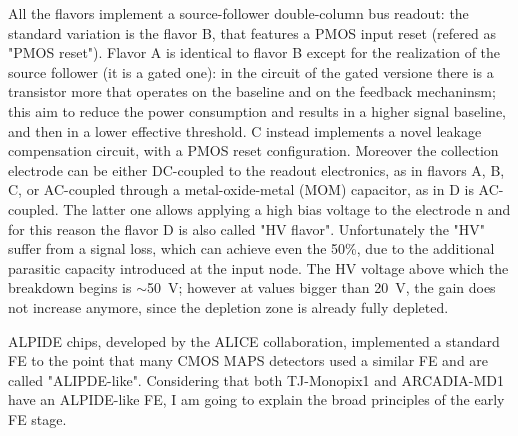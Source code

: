         All the flavors implement a source-follower double-column bus readout: the standard variation is the flavor B, that features a PMOS input reset (refered as "PMOS reset"). Flavor A is identical to flavor B except for the realization of the source follower (it is a gated one): in the circuit of the gated versione there is a transistor more that operates on the baseline and on the feedback mechaninsm; this aim to reduce the power consumption and results in a higher signal baseline, and then in a lower effective threshold.
        C instead implements a novel leakage compensation circuit, with a PMOS reset configuration. 
        Moreover the collection electrode can be either DC-coupled to the readout electronics, as in flavors A, B, C, or AC-coupled through a metal-oxide-metal (MOM) capacitor, as in D is AC-coupled. The latter one allows applying a high bias voltage to the electrode n and for this reason the flavor D is also called "HV flavor".
        Unfortunately the "HV" suffer from a signal loss, which can achieve even the 50\%, due to the additional parasitic capacity introduced at the input node.  
        The HV voltage above which the breakdown begins is $\sim$\SI{50}{V}; however at values bigger than \SI{20}{V}, the gain does not increase anymore, since the depletion zone is already fully depleted. 

            ALPIDE chips, developed by the ALICE collaboration, implemented a standard FE to the point that many CMOS MAPS detectors used a similar FE and are called "ALIPDE-like". 
            Considering that both TJ-Monopix1 and ARCADIA-MD1 have an ALPIDE-like FE, I am going to explain the broad principles of the early FE stage.
            
